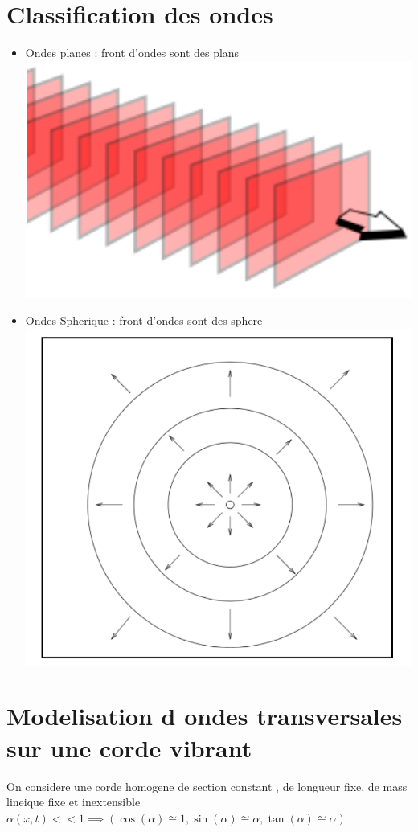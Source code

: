 \documentclass[12pt]{book}
\begin{document}
        \section{Classification des ondes }
            \begin{itemize}
                \item Ondes planes : front d'ondes sont des plans \\ \includegraphics[width=0.3\linewidth]{pic/frontondesplan.png}
                \item Ondes Spherique : front d'ondes sont des sphere \\ \includegraphics[width=0.3\linewidth]{pic/frontondessphere.png}
            \end{itemize}
        \section{Modelisation d ondes transversales sur une corde vibrant}
            On considere une corde homogene de section constant , de longueur fixe, de mass lineique fixe et inextensible
            $\alpha(x,t)<<1 \implies(\cos(\alpha) \cong 1 ,\sin(\alpha)\cong \alpha , \tan(\alpha)\cong \alpha)$\\
            
\end{document}
